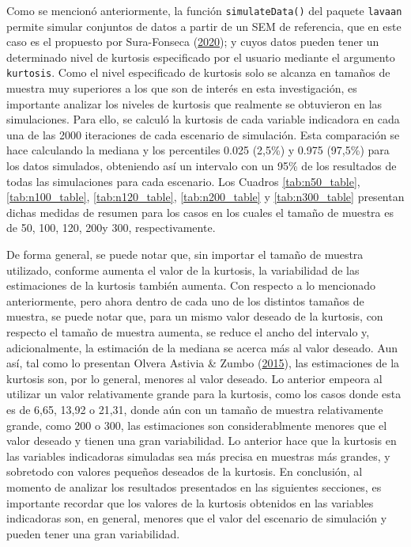 \documentclass[
  english]{revcoles}
\begin{document}
Como se mencionó anteriormente, la función \texttt{simulateData()} del
paquete \texttt{lavaan} permite simular conjuntos de datos a partir de
un SEM de referencia, que en este caso es el propuesto por Sura-Fonseca
(\protect\hyperlink{ref-SuraFonseca2020}{2020}); y cuyos datos pueden
tener un determinado nivel de kurtosis especificado por el usuario
mediante el argumento \texttt{kurtosis}. Como el nivel especificado de
kurtosis solo se alcanza en tamaños de muestra muy superiores a los que
son de interés en esta investigación, es importante analizar los niveles
de kurtosis que realmente se obtuvieron en las simulaciones. Para ello,
se calculó la kurtosis de cada variable indicadora en cada una de las
2000 iteraciones de cada escenario de simulación. Esta comparación se
hace calculando la mediana y los percentiles 0.025 (2,5\%) y 0.975
(97,5\%) para los datos simulados, obteniendo así un intervalo con un
95\% de los resultados de todas las simulaciones para cada escenario.
Los Cuadros \ref{tab:n50_table}, \ref{tab:n100_table},
\ref{tab:n120_table}, \ref{tab:n200_table} y \ref{tab:n300_table}
presentan dichas medidas de resumen para los casos en los cuales el
tamaño de muestra es de 50, 100, 120, 200y 300, respectivamente.

De forma general, se puede notar que, sin importar el tamaño de muestra
utilizado, conforme aumenta el valor de la kurtosis, la variabilidad de
las estimaciones de la kurtosis también aumenta. Con respecto a lo
mencionado anteriormente, pero ahora dentro de cada uno de los distintos
tamaños de muestra, se puede notar que, para un mismo valor deseado de
la kurtosis, con respecto el tamaño de muestra aumenta, se reduce el
ancho del intervalo y, adicionalmente, la estimación de la mediana se
acerca más al valor deseado. Aun así, tal como lo presentan Olvera
Astivia \& Zumbo (\protect\hyperlink{ref-OlveraAstivia2015}{2015}), las
estimaciones de la kurtosis son, por lo general, menores al valor
deseado. Lo anterior empeora al utilizar un valor relativamente grande
para la kurtosis, como los casos donde esta es de 6,65, 13,92 o 21,31,
donde aún con un tamaño de muestra relativamente grande, como 200 o 300,
las estimaciones son considerablmente menores que el valor deseado y
tienen una gran variabilidad. Lo anterior hace que la kurtosis en las
variables indicadoras simuladas sea más precisa en muestras más grandes,
y sobretodo con valores pequeños deseados de la kurtosis. En conclusión,
al momento de analizar los resultados presentados en las siguientes
secciones, es importante recordar que los valores de la kurtosis
obtenidos en las variables indicadoras son, en general, menores que el
valor del escenario de simulación y pueden tener una gran variabilidad.
\end{document}
